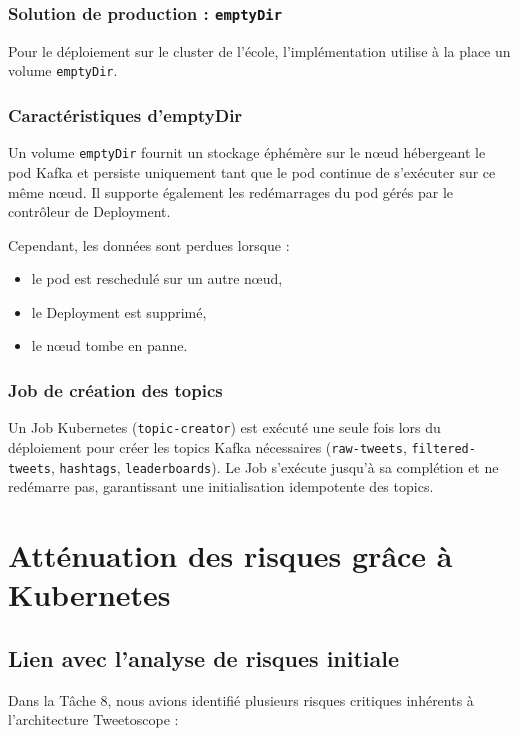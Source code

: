 \documentclass[10pt,a4paper]{article}
\begin{document}
\subsubsection{Solution de production : \texttt{emptyDir}}

Pour le déploiement sur le cluster de l’école, l’implémentation utilise à la place un volume \texttt{emptyDir}.

\subsubsection{Caractéristiques d’emptyDir}

Un volume \texttt{emptyDir} fournit un stockage éphémère sur le nœud hébergeant le pod Kafka et persiste uniquement tant que le pod continue de s’exécuter sur ce même nœud. Il supporte également les redémarrages du pod gérés par le contrôleur de Deployment.

Cependant, les données sont perdues lorsque :

\begin{itemize}
    \item le pod est reschedulé sur un autre nœud,
    \item le Deployment est supprimé,
    \item le nœud tombe en panne.
\end{itemize}

\subsubsection{Job de création des topics}

Un Job Kubernetes (\texttt{topic-creator}) est exécuté une seule fois lors du déploiement pour créer les topics Kafka nécessaires (\texttt{raw-tweets}, \texttt{filtered-tweets}, \texttt{hashtags}, \texttt{leaderboards}). Le Job s’exécute jusqu’à sa complétion et ne redémarre pas, garantissant une initialisation idempotente des topics.

\section{Atténuation des risques grâce à Kubernetes}

\subsection{Lien avec l’analyse de risques initiale}

Dans la Tâche 8, nous avions identifié plusieurs risques critiques inhérents à l’architecture Tweetoscope :
\end{document}
